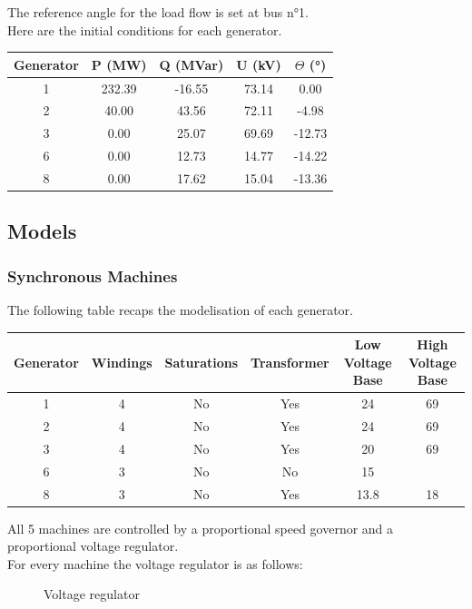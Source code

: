 \documentclass[a4paper, 12pt]{report}
\begin{document}
The reference angle for the load flow is set at bus n°1. \\

Here are the initial conditions for each generator.

\begin{center}
\begin{tabular}{|c|c|c|c|c|}
  \hline
  Generator & P (MW) & Q (MVar) & U (kV) & $\Theta$ (°) \\
  \hline
  1 & 232.39 & -16.55 & 73.14 & 0.00\\
  2 & 40.00 & 43.56 & 72.11 & -4.98\\
  3 & 0.00 & 25.07 & 69.69 & -12.73\\
  6 & 0.00 & 12.73 & 14.77 & -14.22\\
  8 & 0.00 & 17.62 & 15.04 & -13.36\\
  \hline
\end{tabular}
\end{center}

\subsection{Models}

\subsubsection{Synchronous Machines}

The following table recaps the modelisation of each generator.

\begin{center}
\begin{tabular}{|c|c|c|c|c|c|}
  \hline
  Generator & Windings  & Saturations & Transformer & Low Voltage Base & High Voltage Base\\
  \hline
  1 & 4 & No & Yes & 24 & 69\\
  2 & 4 & No & Yes & 24 & 69\\
  3 & 4 & No & Yes & 20 & 69\\
  6 & 3 & No & No & 15 &  \\
  8 & 3 & No & Yes & 13.8 & 18\\
  \hline
\end{tabular}
\end{center}

All 5 machines are controlled by a proportional speed governor and a proportional voltage regulator. \\

For every machine the voltage regulator is as follows:
\begin{figure}[H]
\centering
{}
\caption{Voltage regulator}
\end{figure}
\end{document}
